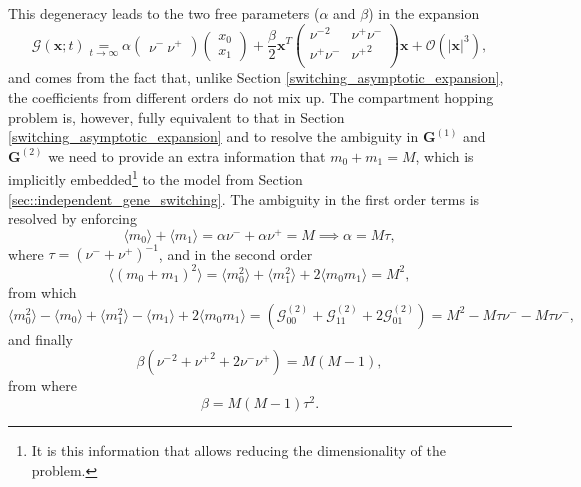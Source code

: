 \documentclass[a4paper, 11pt]{article}
\newcommand\underl[2]{\mathrel{\mathop{#2}\limits_{#1}}}
\begin{document}
This degeneracy leads to the two free parameters ($\alpha$ and $\beta$) in the expansion
\begin{equation*}
  \mathcal G(\mathbf x; t) \underl{t\to\infty}{=}\alpha
  \begin{pmatrix}
    \nu^-\ 
    \nu^+
  \end{pmatrix}
  \begin{pmatrix}
  x_0\\
  x_1
  \end{pmatrix}
  + \frac{\beta}{2}\mathbf x^T
  \left( \begin{array}{cc}
    {\nu^-}^2 & \nu^+\nu^-\\
    \nu^+\nu^- & {\nu^+}^2 \\
  \end{array} \right)\mathbf x
  + \mathcal O(|\mathbf x|^3),
\end{equation*}
and comes from the fact that, unlike Section \ref{switching_asymptotic_expansion}, the coefficients from different orders do not mix up. The compartment hopping problem is, however, fully equivalent to that in Section \ref{switching_asymptotic_expansion} and to resolve the ambiguity in $\boldsymbol{\mathbf G}^{(1)}$ and $\boldsymbol{\mathbf G}^{(2)}$ we need to provide an extra information that $m_0+m_1=M$, which is implicitly embedded\footnote{It is this information that allows reducing the dimensionality of the problem.} to the model from Section \ref{sec::independent_gene_switching}. The ambiguity in the first order terms is resolved by enforcing
\begin{equation*}
  \langle m_0 \rangle + \langle m_1\rangle = \alpha\nu^- + \alpha\nu^+ = M \implies \alpha = M\tau,
\end{equation*}
where $\tau = (\nu^- + \nu^+)^{-1}$, and in the second order
\begin{equation*}
  \langle(m_0 + m_1)^2\rangle = \langle m_0^2\rangle + \langle m_1^2\rangle + 2\langle m_0m_1\rangle = M^2, 
\end{equation*}
from which
\begin{equation*}
  \langle m_0^2\rangle - \langle m_0\rangle + \langle m_1^2\rangle - \langle m_1\rangle + 2\langle m_0m_1\rangle = \left(\mathcal G_{00}^{(2)} + \mathcal G_{11}^{(2)} + 2\mathcal G_{01}^{(2)} \right) = M^2 - M\tau\nu^- - M\tau\nu^-, 
\end{equation*}
and finally
\begin{equation*}
  \beta\left({\nu^-}^2 + {\nu^+}^2 + 2\nu^-\nu^+\right) = M(M-1),
\end{equation*}
from where
\begin{equation*}
  \beta = M(M-1)\tau^2.
\end{equation*}
\end{document}
